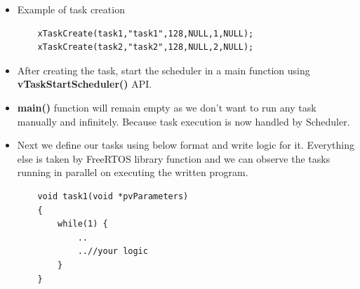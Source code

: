 \begin{itemize}
\begin{itemize}
    \end{itemize}
    \item Example of task creation
    \begin{lstlisting}
    xTaskCreate(task1,"task1",128,NULL,1,NULL);
    xTaskCreate(task2,"task2",128,NULL,2,NULL);  
    \end{lstlisting}
    \item After creating the task, start the scheduler in a main function using \textbf{vTaskStartScheduler()} API.
    \item \textbf{main()} function will remain empty as we don’t want to run any task manually and infinitely. Because task execution is now handled by Scheduler.
    \item Next we define our tasks using below format and write logic for it. Everything else is taken by FreeRTOS library function and we can observe the tasks running in parallel on executing the written program.
    \begin{lstlisting}
    void task1(void *pvParameters)  
    {
        while(1) {
            ..
            ..//your logic
        }
    }
    \end{lstlisting}
\end{itemize}
\newpage





